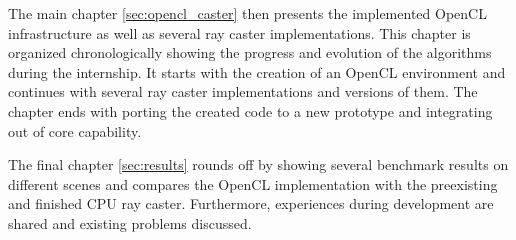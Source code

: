 The main chapter \ref{sec:opencl_caster} then presents the implemented OpenCL infrastructure as well as several ray caster implementations. This chapter is organized chronologically showing the progress and evolution of the algorithms during the internship. It starts with the creation of an OpenCL environment and continues with several ray caster implementations and versions of them. The chapter ends with porting the created code to a new prototype and integrating out of core capability.

The final chapter \ref{sec:results} rounds off by showing several benchmark results on different scenes and compares the OpenCL implementation with the preexisting and finished CPU ray caster. Furthermore, experiences during development are shared and existing problems discussed.
 